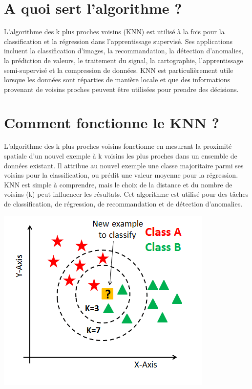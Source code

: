 \documentclass[a0,portrait]{a0poster}
\begin{document}




\color{SaddleBrown} %

\section*{A quoi sert l'algorithme ?}

L'algorithme des k plus proches voisins (KNN) est utilisé à la fois pour la classification et la régression dans l'apprentissage supervisé. Ses applications incluent la classification d'images, la recommandation, la détection d'anomalies, la prédiction de valeurs, le traitement du signal, la cartographie, l'apprentissage semi-supervisé et la compression de données. KNN est particulièrement utile lorsque les données sont réparties de manière locale et que des informations provenant de voisins proches peuvent être utilisées pour prendre des décisions.

\color{DarkSlateGray} %

\section*{Comment fonctionne le KNN ?}

L'algorithme des k plus proches voisins fonctionne en mesurant la proximité spatiale d'un nouvel exemple à k voisins les plus proches dans un ensemble de données existant. Il attribue au nouvel exemple une classe majoritaire parmi ses voisins pour la classification, ou prédit une valeur moyenne pour la régression. KNN est simple à comprendre, mais le choix de la distance et du nombre de voisins (k) peut influencer les résultats. Cet algorithme est utilisé pour des tâches de classification, de régression, de recommandation et de détection d'anomalies.

\begin{center}\vspace{1cm}
    \includegraphics[width=0.3\linewidth]{knn.png}
\end{center}
\end{document}
